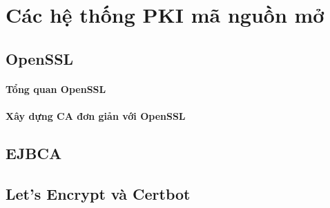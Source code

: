 \chapter{Các hệ thống PKI mã nguồn mở}
\label{chap:opensource}


\section{OpenSSL}
\label{sec:6.1}

\subsubsection*{Tổng quan OpenSSL}

\subsubsection*{Xây dựng CA đơn giản với OpenSSL}

\section{EJBCA}
\label{sec:6.2}

\section{Let's Encrypt và Certbot}
\label{sec:6.3}

